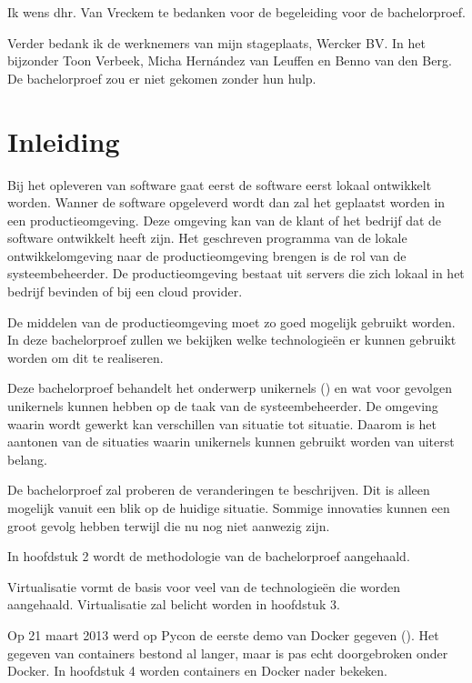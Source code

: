 \documentclass[pdftex,a4paper,12pt,twoside]{report}
\begin{document}
Ik wens dhr. Van Vreckem te bedanken voor de begeleiding voor de bachelorproef.

Verder bedank ik de werknemers van mijn stageplaats, Wercker BV. In het bijzonder Toon Verbeek, Micha Hernández van Leuffen en Benno van den Berg. De bachelorproef zou er niet gekomen zonder hun hulp.

\tableofcontents

\chapter{Inleiding}
\label{ch:inleiding}

Bij het opleveren van software gaat eerst de software eerst lokaal ontwikkelt worden. Wanner de software opgeleverd wordt dan zal het geplaatst worden in een productieomgeving. Deze omgeving kan van de klant of het bedrijf dat de software ontwikkelt heeft zijn. Het geschreven programma van de lokale ontwikkelomgeving naar de productieomgeving brengen is de rol van de systeembeheerder. De productieomgeving bestaat uit servers die zich lokaal in het bedrijf bevinden of bij een cloud provider.

De middelen van de productieomgeving moet zo goed mogelijk gebruikt worden. In deze bachelorproef zullen we bekijken welke technologieën er kunnen gebruikt worden om dit te realiseren.

Deze bachelorproef behandelt het onderwerp unikernels (\cite{mao_performance_2012}) en wat voor gevolgen unikernels kunnen hebben op de taak van de systeembeheerder. De omgeving waarin wordt gewerkt kan verschillen van situatie tot situatie. Daarom is het aantonen van de situaties waarin unikernels kunnen gebruikt worden van uiterst belang.

De bachelorproef zal proberen de veranderingen te beschrijven. Dit is alleen mogelijk vanuit een blik op de huidige situatie. Sommige innovaties kunnen een groot gevolg hebben terwijl die nu nog niet aanwezig zijn.

In hoofdstuk 2 wordt de methodologie van de bachelorproef aangehaald.

Virtualisatie vormt de basis voor veel van de technologieën die worden aangehaald. Virtualisatie zal belicht worden in hoofdstuk 3.

Op 21 maart 2013 werd op Pycon de eerste demo van Docker gegeven (\cite{hykes_future_2013}). Het gegeven van containers bestond al langer, maar is pas echt doorgebroken onder Docker. In hoofdstuk 4 worden containers en Docker nader bekeken.
\end{document}
